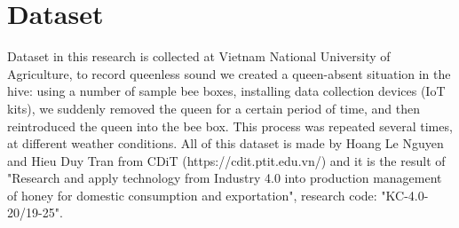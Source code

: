 \section{Dataset}
Dataset in this research is collected at Vietnam National University of
Agriculture, to record queenless sound we created a queen-absent
situation in the hive: using a number of sample bee boxes, installing
data collection devices (IoT kits), we suddenly removed the queen for a
certain period of time, and then reintroduced the queen into the bee
box. This process was repeated several times, at different weather
conditions. All of this dataset is made by Hoang Le Nguyen and Hieu
Duy Tran from CDiT (https://cdit.ptit.edu.vn/) and it is the result of
"Research and apply technology from Industry 4.0 into production
management of honey for domestic consumption and exportation",
research code: "KC-4.0-20/19-25". \cite{pham2020industry4}